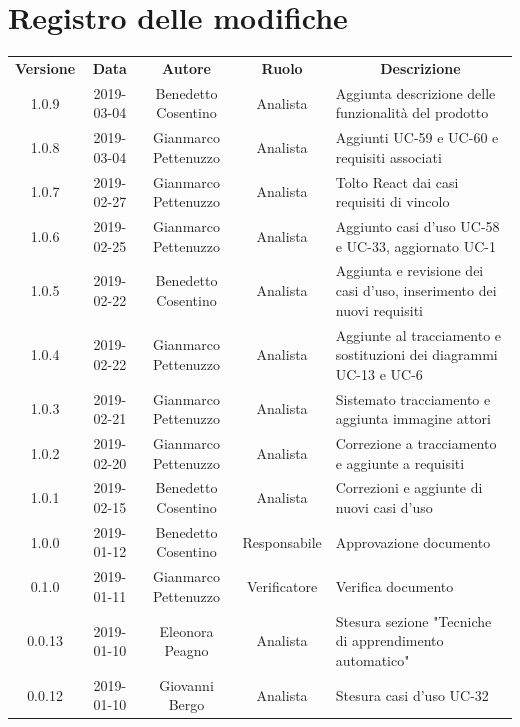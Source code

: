 \documentclass[11pt,a4paper]{article}
\begin{document}
	
	{\def\arraystretch{2}\tabcolsep=10pt
	\newpage
	\section*{\centering Registro delle modifiche}
	\begin{tabularx}{\textwidth}{ c | c | c | c | X }
		\rowcolor{LightBlue}
		\color{white}\bfseries Versione & \color{white}\bfseries Data & \color{white}\bfseries Autore & \color{white}\bfseries Ruolo & \multicolumn{1}{c}{\color{white}\bfseries Descrizione}\\[0.25cm]
		1.0.9 & 2019-03-04 & Benedetto Cosentino & Analista & Aggiunta descrizione delle funzionalità del prodotto\\ \hline
		1.0.8 & 2019-03-04 & Gianmarco Pettenuzzo & Analista & Aggiunti UC-59 e UC-60 e requisiti associati \\ \hline
		1.0.7 & 2019-02-27 & Gianmarco Pettenuzzo & Analista & Tolto React dai casi requisiti di vincolo\\ \hline
		1.0.6 & 2019-02-25 & Gianmarco Pettenuzzo & Analista & Aggiunto casi d'uso UC-58 e UC-33, aggiornato UC-1\\ \hline
		1.0.5 & 2019-02-22 & Benedetto Cosentino & Analista & Aggiunta e revisione dei casi d'uso, inserimento dei nuovi requisiti\\ \hline
		1.0.4 & 2019-02-22 & Gianmarco Pettenuzzo & Analista & Aggiunte al tracciamento e sostituzioni dei diagrammi UC-13 e UC-6\\ \hline
		1.0.3 & 2019-02-21 & Gianmarco Pettenuzzo & Analista & Sistemato tracciamento e aggiunta immagine attori\\ \hline
		1.0.2 & 2019-02-20 & Gianmarco Pettenuzzo & Analista & Correzione a tracciamento e aggiunte a requisiti\\ \hline
		1.0.1 & 2019-02-15 & Benedetto Cosentino & Analista & Correzioni e aggiunte di nuovi casi d'uso \\ \hline
		1.0.0 & 2019-01-12 & Benedetto Cosentino & Responsabile & Approvazione documento \\ \hline
		0.1.0 & 2019-01-11 & Gianmarco Pettenuzzo & Verificatore & Verifica documento \\ \hline
		0.0.13 & 2019-01-10 & Eleonora Peagno & Analista & Stesura sezione "Tecniche di apprendimento automatico" \\ \hline
		0.0.12 & 2019-01-10 & Giovanni Bergo & Analista & Stesura casi d'uso UC-32 \\ \hline

\end{tabularx}}
\end{document}
